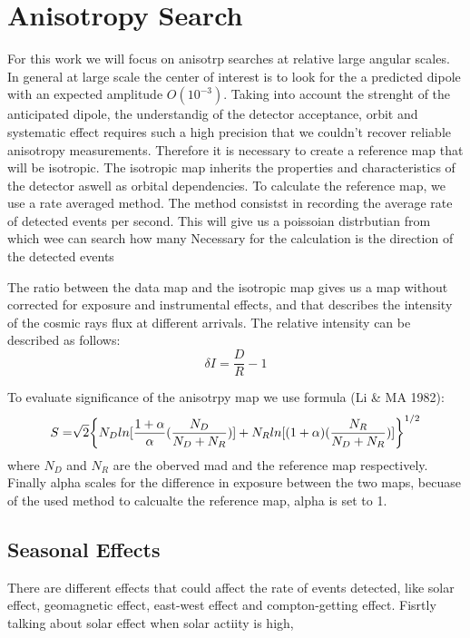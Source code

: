 \documentclass{PoS}
\begin{document}
\section{Anisotropy Search}
For this work we will focus on anisotrp searches at relative large  angular scales. In general at large scale the center of interest is to look for the a predicted  dipole with an expected amplitude $O (10^{-3})$. Taking into account the strenght of the anticipated dipole, the understandig of the detector acceptance, orbit and systematic effect requires such a high precision that we couldn't recover reliable anisotropy measurements.
Therefore it is necessary to create a reference map that will be isotropic.
The isotropic map inherits the properties and characteristics of the detector aswell as orbital dependencies. To calculate the  reference map, we use a rate averaged method. The method consistst in  recording the average rate of detected events per second. This will  give us a poissoian distrbutian from which wee can search how many
Necessary for the calculation is the  direction of the detected events


The ratio between the data map and the isotropic map gives us a map without corrected for exposure and instrumental effects, and that describes the intensity of the cosmic rays flux at different  arrivals. The relative intensity can be described as follows:
\begin{equation}
\delta I=\frac{D}{R} -1
\end{equation}

To evaluate significance of the anisotrpy map we use formula (Li \& MA 1982):
\begin{equation}
S=\sqrt[]{2} \bigg{\{} N_D \space ln [ \frac{1+\alpha}{\alpha} (\frac{N_D}{N_D+N_R}) ] +N_R ln[(1+\alpha)(\frac{N_R}{N_D+N_R})] \bigg{\}}^{1/2}
\end{equation}
where $N_D$  and $N_R$ are the oberved mad and the reference map respectively. Finally alpha scales for the difference in exposure between the two maps, becuase of the used method to calcualte the reference map, alpha is set to 1.
\subsection{Seasonal Effects}
There are different effects that could affect the rate of events detected, like solar effect, geomagnetic effect, east-west effect and compton-getting effect.
Fisrtly talking about solar effect when  solar actiity is high,
\end{document}
